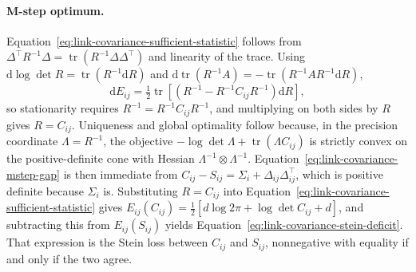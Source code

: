 \paragraph{M-step optimum.} Equation~\eqref{eq:link-covariance-sufficient-statistic} follows from \(\Delta^\top R^{-1}\Delta=\operatorname{tr}(R^{-1}\Delta\Delta^\top)\) and linearity of the trace. Using \(\mathrm{d}\log\det R=\operatorname{tr}(R^{-1}\mathrm{d}R)\) and \(\mathrm{d}\operatorname{tr}(R^{-1}A)=-\operatorname{tr}(R^{-1}AR^{-1}\mathrm{d}R)\),
\begin{equation}
\mathrm{d}E_{ij}=\tfrac12\operatorname{tr}\left[\left(R^{-1}-R^{-1}C_{ij}R^{-1}\right)\mathrm{d}R\right],
\label{eq:appendix-link-differential}
\end{equation}
so stationarity requires \(R^{-1}=R^{-1}C_{ij}R^{-1}\), and multiplying on both sides by \(R\) gives \(R=C_{ij}\). Uniqueness and global optimality follow because, in the precision coordinate \(\Lambda=R^{-1}\), the objective \(-\log\det\Lambda+\operatorname{tr}(\Lambda C_{ij})\) is strictly convex on the positive-definite cone with Hessian \(\Lambda^{-1}\otimes\Lambda^{-1}\). Equation~\eqref{eq:link-covariance-mstep-gap} is then immediate from \(C_{ij}-S_{ij}=\Sigma_i+\Delta_{ij}\Delta_{ij}^\top\), which is positive definite because \(\Sigma_i\) is. Substituting \(R=C_{ij}\) into Equation~\eqref{eq:link-covariance-sufficient-statistic} gives \(E_{ij}(C_{ij})=\tfrac12[d\log2\pi+\log\det C_{ij}+d]\), and subtracting this from \(E_{ij}(S_{ij})\) yields Equation~\eqref{eq:link-covariance-stein-deficit}. That expression is the Stein loss between \(C_{ij}\) and \(S_{ij}\), nonnegative with equality if and only if the two agree.

